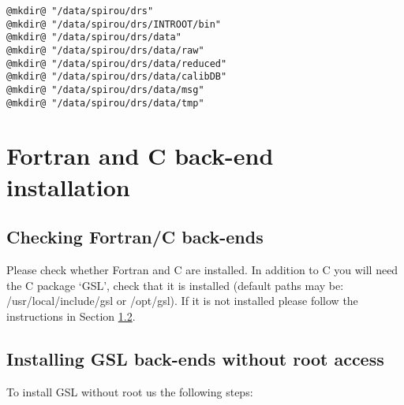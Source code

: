 \begin{lstlisting}[style=bashstyle]
@mkdir@ "/data/spirou/drs"
@mkdir@ "/data/spirou/drs/INTROOT/bin"
@mkdir@ "/data/spirou/drs/data"
@mkdir@ "/data/spirou/drs/data/raw"
@mkdir@ "/data/spirou/drs/data/reduced"
@mkdir@ "/data/spirou/drs/data/calibDB"
@mkdir@ "/data/spirou/drs/data/msg"
@mkdir@ "/data/spirou/drs/data/tmp"
\end{lstlisting}

\section{Fortran and C back-end installation}
\label{section:fortran_gsl}

\subsection{Checking Fortran/C back-ends}
\label{section:checking for Fortran/C}


Please check whether Fortran and C are installed. In addition to C you will need the C package `GSL', check that it is installed (default paths may be: /usr/local/include/gsl or /opt/gsl). If it is not installed please follow the instructions in Section \ref{section:install-gsl}.

\subsection{Installing GSL back-ends without root access}
\label{section:install-gsl}

To install GSL without root us the following steps:

